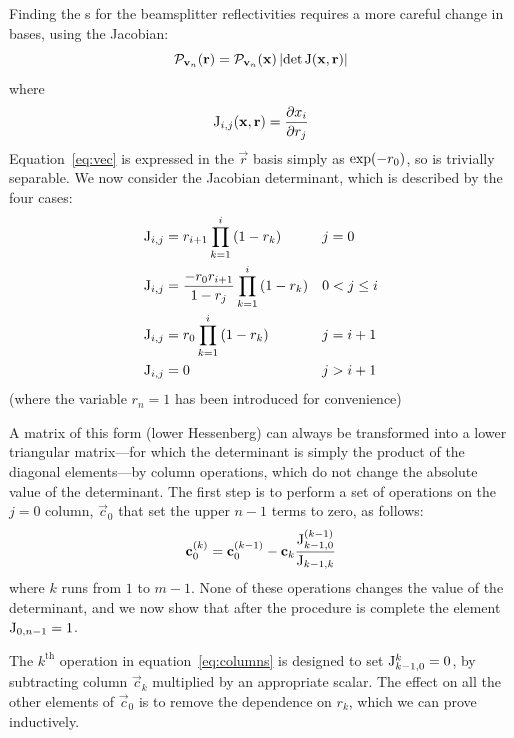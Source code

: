 Finding the \pdf{}s for the beamsplitter reflectivities requires a more careful
change in bases, using the Jacobian:
\begin{equation}
  \mathcal{P}_{\mathbf{v}_n} \!\left(\mathbf{r}\right) = \mathcal{P}_{\mathbf{v}_n} \!\left(\mathbf{x}\right)
  \left|\det \mathrm{J} \!\left(\mathbf{x}, \mathbf{r}\right)\right|
\end{equation}
where
\begin{equation}
  \mathrm{J}_{i,j} \!\left(\mathbf{x}, \mathbf{r}\right) = \frac{\partial x_{i}}{\partial r_j}
\end{equation}
Equation~\ref{eq:vec} is expressed in the \(\vec{r}\) basis simply as \(\exp
\!\left(-r_0\right)\), so is trivially separable. We now consider the Jacobian
determinant, which is described by the four cases:
\begin{align}
  \label{eq:firstcolumn}
  \mathrm{J}_{i,j} &= r_{i+1} \prod_{k=1}^{i} \left( 1-r_k \right) && j=0 \\
  \mathrm{J}_{i,j} &= \frac{-r_0 r_{i+1}}{1-r_{j}} \prod_{k=1}^{i} \left( 1-r_k
    \right) && 0< j \leq i\\
  \label{eq:diagonal}
  \mathrm{J}_{i,j} &= r_0 \prod_{k=1}^{i} \left( 1-r_k \right) && j = i+1 \\
  \mathrm{J}_{i,j} &= 0 && j>i+1
\end{align}
(where the variable \(r_{n}=1\) has been introduced for convenience)

A matrix of this form (lower Hessenberg) can always be transformed into a
lower triangular matrix---for which the determinant is simply the product of the
diagonal elements---by column operations, which do not change the absolute value
of the determinant. The first step is to perform a set of operations on the
\(j=0\) column, \(\vec{c}_{0}\) that set the upper \(n-1\) terms to zero, as
follows:
\begin{equation}
  \label{eq:columns}
  \mathbf{c}_{0}^{\left( k \right)} = \mathbf{c}_{0}^{\left( k-1 \right)} -
  \mathbf{c}_{k} \frac{\mathrm{J}_{k-1,0}^{\left( k-1 \right)}}{\mathrm{J}_{k-1,k}}
\end{equation}
where \(k\) runs from \(1\) to \(m-1\). None of these operations changes the
value of the determinant, and we now show that after the procedure is complete
the element \(\mathrm{J}_{0,n-1}=1\).

The \(k^{\text{th}}\) operation in equation~\ref{eq:columns} is designed to set
\(\mathrm{J}_{k-1,0}^{k}=0\), by subtracting column \(\vec{c}_{k}\) multiplied by an appropriate scalar. The effect on all
the other elements of \(\vec{c}_{0}\) is to remove the dependence on \(r_{k}\),
which we can prove inductively.

